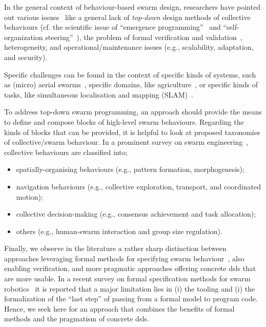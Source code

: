In the general context of behaviour-based swarm design,
 researchers have pointed out various issues~\cite{DBLP:journals/swarm/BrambillaFBD13,DBLP:journals/scirobotics/TheraulazT20}
 like a general lack
 of \emph{top-down} design methods of collective behaviours
 (cf. the scientific issue of ``emergence programming''~\cite{varenne2015programming-emergence} and  ``self-organization steering''~\cite{DBLP:journals/alife/GershensonTWS20}),
 the problem of formal verification and validation~\cite{DBLP:journals/csur/LuckcuckFDDF19},
 heterogeneity, 
 and operational/maintenance issues
 (e.g., scalability, adaptation, and security). 

Specific challenges can be found in the context of 
specific kinds of systems,
such as (micro) aerial swarms~\cite{Abdelkader2021aerialswarms,%
Coppola2020microairswarms},
specific domains,
like agriculture~\cite{DBLP:journals/cea/AlbieroGUP22},
or specific kinds of tasks,
like simultaneous localisation and mapping (SLAM)~\cite{Kegeleirs2021slam}.


To address %
 top-down swarm programming,
 an approach should provide
 the means to define and compose 
 blocks of high-level swarm behaviours.%
%
Regarding the kinds of blocks that can be provided,
 it is helpful to look at proposed taxonomies of collective/swarm behaviour.
%
In a prominent survey on swarm engineering~\cite{DBLP:journals/swarm/BrambillaFBD13},
 collective behaviours are classified into;
\begin{itemize}
  \item spatially-organising behaviours (e.g., pattern formation, morphogenesis);
  \item navigation behaviours (e.g., collective exploration, transport, and coordinated motion);
  \item collective decision-making (e.g., consensus achievement and task allocation);
  \item others (e.g., human-swarm interaction and group size regulation).
\end{itemize} 
Finally, we observe in the literature 
 a rather sharp distinction
 between approaches leveraging
 formal methods for specifying swarm behaviour~\cite{DBLP:journals/csur/LuckcuckFDDF19},
 also enabling verification,
 and more pragmatic approaches
 offering concrete \acp{dsl} 
 that are more usable.
%
In a recent survey on formal specification methods for swarm robotics~\cite{DBLP:journals/csur/LuckcuckFDDF19}
 it is reported that a major limitation lies in (i) the tooling and (i) the formalization of the ``last step'' of passing from a formal model to program code.
%
Hence, we seek here for an approach that combines the benefits of formal methods and the pragmatism of concrete \acp{dsl}.

